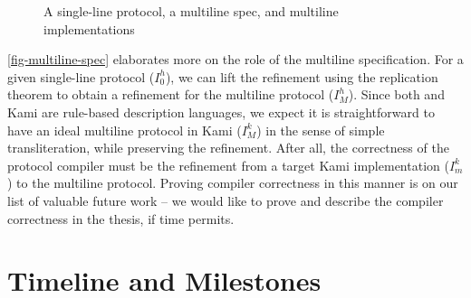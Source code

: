 \begin{figure}[h]
  \centering
  \caption{A single-line protocol, a multiline spec, and multiline implementations}
  \label{fig-multiline-spec}
\end{figure}

\autoref{fig-multiline-spec} elaborates more on the role of the multiline specification.
For a given \hemiola{} single-line protocol ($I^{h}_{0}$), we can lift the refinement using the replication theorem to obtain a refinement for the multiline protocol ($I^{h}_{M}$).
Since both \hemiola{} and Kami are rule-based description languages, we expect it is straightforward to have an ideal multiline protocol in Kami ($I^{k}_{M}$) in the sense of simple transliteration, while preserving the refinement.
After all, the correctness of the protocol compiler must be the refinement from a target Kami implementation ($I^{k}_{m}$) to the multiline protocol.
Proving compiler correctness in this manner is on our list of valuable future work -- we would like to prove and describe the compiler correctness in the thesis, if time permits.

\section{Timeline and Milestones}

